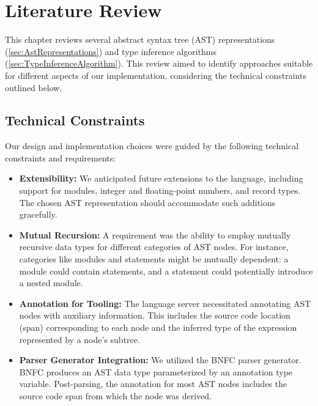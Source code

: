 \chapter{Literature Review}
\label{chap:LiteratureReview}

This chapter reviews several abstract syntax tree (AST) representations (\cref{sec:AstRepresentations}) and type inference algorithms (\cref{sec:TypeInferenceAlgorithm}). This review aimed to identify approaches suitable for different aspects of our implementation, considering the technical constraints outlined below.

\section{Technical Constraints}
\label{chap:LiteratureReview:sec:AstRepresentations:TechnicalConstraints}

Our design and implementation choices were guided by the following technical constraints and requirements:

\begin{itemize}
  \item \textbf{Extensibility:} We anticipated future extensions to the language, including support for modules, integer and floating-point numbers, and record types. The chosen AST representation should accommodate such additions gracefully.
  \item \textbf{Mutual Recursion:} A requirement was the ability to employ mutually recursive data types for different categories of AST nodes. For instance, categories like modules and statements might be mutually dependent: a module could contain statements, and a statement could potentially introduce a nested module.
  \item \textbf{Annotation for Tooling:} The language server necessitated annotating AST nodes with auxiliary information. This includes the source code location (span) corresponding to each node and the inferred type of the expression represented by a node's subtree.
  \item \textbf{Parser Generator Integration:} We utilized the BNFC parser generator. BNFC produces an AST data type parameterized by an annotation type variable. Post-parsing, the annotation for most AST nodes includes the source code span from which the node was derived.
\end{itemize}

